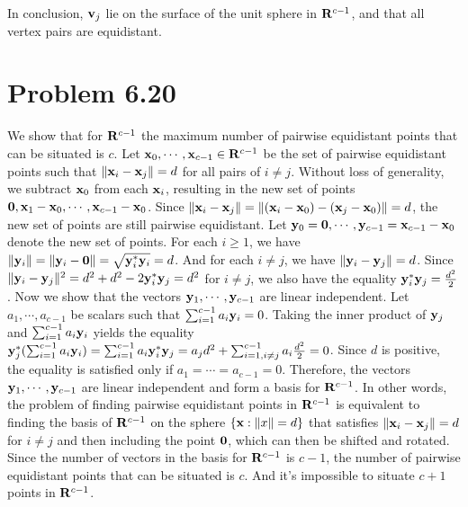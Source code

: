 \documentclass{scrartcl}
\begin{document}
In conclusion, $\mathbf{v}_j$ lie on the surface of the unit sphere in $\mathbf{R}^{c-1}$, and that all vertex pairs are equidistant.


\section*{Problem 6.20}

We show that for $\mathbf{R}^{c-1}$ the maximum number of pairwise equidistant points that can be situated is $c$. Let $\mathbf{x}_0, \cdots, \mathbf{x}_{c-1} \in \mathbf{R}^{c-1}$
be the set of pairwise equidistant points such that $\|\mathbf{x}_i - \mathbf{x}_j\| = d$ for all pairs of $i \neq j$. Without loss of generality, we subtract $\mathbf{x}_0$
from each $\mathbf{x}_i$, resulting in the new set of points $\mathbf{0}, \mathbf{x}_1-\mathbf{x}_0, \cdots, \mathbf{x}_{c-1}-\mathbf{x}_0$. Since
$\|\mathbf{x}_i - \mathbf{x}_j\| = \|(\mathbf{x}_i-\mathbf{x}_0) - (\mathbf{x}_j-\mathbf{x}_0)\|=d$, the new set of points are still pairwise equidistant.
Let $\mathbf{y}_0 = \mathbf{0}, \cdots, \mathbf{y}_{c-1} = \mathbf{x}_{c-1}-\mathbf{x}_0$ denote the new set of points. For each $i \ge 1$, we have
$\|\mathbf{y}_i\| = \|\mathbf{y}_i-\mathbf{0}\| = \sqrt{\mathbf{y}_i^*\mathbf{y}_i} = d$. And for each $i \neq j$, we have $\|\mathbf{y}_i-\mathbf{y}_j\| = d$. Since
$\|\mathbf{y}_i-\mathbf{y}_j\|^2 = d^2+d^2-2\mathbf{y}_i^*\mathbf{y}_j=d^2$ for $i \neq j$, we also have the equality $\mathbf{y}_i^*\mathbf{y}_j = {d^2 \over 2}$.
Now we show that the vectors $\mathbf{y}_1, \cdots, \mathbf{y}_{c-1}$ are linear independent. Let $a_1, \cdots, a_{c-1}$ be scalars such that
$\sum_{i=1}^{c-1} a_i \mathbf{y}_i = 0$. Taking the inner product of $\mathbf{y}_j$ and $\sum_{i=1}^{c-1} a_i \mathbf{y}_i$ yields the equality
$\mathbf{y}_j^*(\sum_{i=1}^{c-1} a_i \mathbf{y}_i) = \sum_{i=1}^{c-1} a_i \mathbf{y}_i^*\mathbf{y}_j = a_j d^2 + \sum_{i=1, i \neq j}^{c-1} a_i {d^2 \over 2}= 0$.
Since $d$ is positive, the equality is satisfied only if $a_1 = \cdots = a_{c-1} = 0$. Therefore, the vectors $\mathbf{y}_1, \cdots, \mathbf{y}_{c-1}$ are linear
independent and form a basis for $\mathbf{R}^{c-1}$. In other words, the problem of finding pairwise equidistant points in $\mathbf{R}^{c-1}$ is equivalent to
finding the basis of $\mathbf{R}^{c-1}$ on the sphere $\{\mathbf{x} : \|x\|=d\}$ that satisfies $\|\mathbf{x}_i-\mathbf{x}_j\| = d$ for $i \neq j$ and then including the
point $\mathbf{0}$, which can then be shifted and rotated. Since the number of vectors in the basis for $\mathbf{R}^{c-1}$ is $c-1$, the number of pairwise equidistant points
that can be situated is $c$. And it's impossible to situate $c+1$ points in $\mathbf{R}^{c-1}$.
\end{document}
